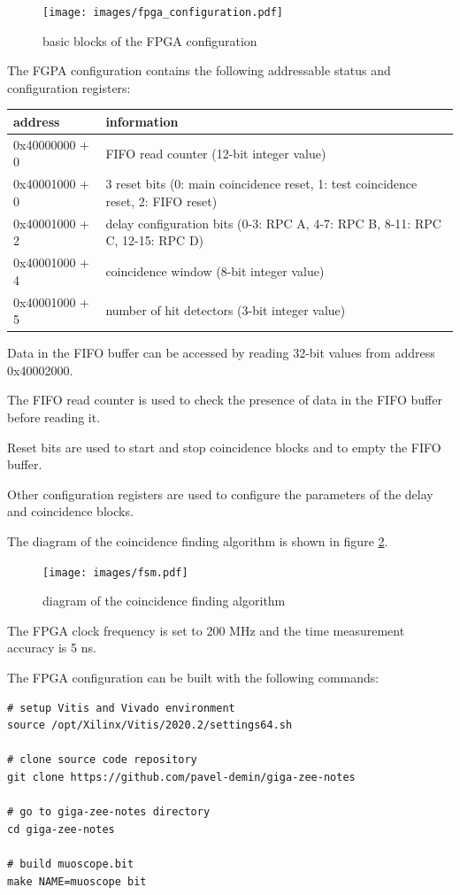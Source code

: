 \documentclass[12pt, a4paper]{article}
\begin{document}
\begin{figure}[h!]
  \centering
  \texttt{[image: images/fpga\_configuration.pdf]}
  \caption{basic blocks of the FPGA configuration}
  \label{fig:fpga_configuration}
\end{figure}

The FGPA configuration contains the following addressable status and configuration registers:
\begin{center}
  \begin{tabular}{|l|l|}
  \hline
  \textbf{address} & \textbf{information} \\
  \hline
  0x40000000 + 0 & FIFO read counter (12-bit integer value) \\
  \hline
  0x40001000 + 0 & 3 reset bits (0: main coincidence reset, 1: test coincidence reset, 2: FIFO reset) \\
  \hline
  0x40001000 + 2 & delay configuration bits (0-3: RPC A, 4-7: RPC B, 8-11: RPC C, 12-15: RPC D) \\
  \hline
  0x40001000 + 4 & coincidence window (8-bit integer value) \\
  \hline
  0x40001000 + 5 & number of hit detectors (3-bit integer value) \\
  \hline
  \end{tabular}
\end{center}

Data in the FIFO buffer can be accessed by reading 32-bit values from address 0x40002000.

The FIFO read counter is used to check the presence of data in the FIFO buffer before reading it.

Reset bits are used to start and stop coincidence blocks and to empty the FIFO buffer.

Other configuration registers are used to configure the parameters of the delay and coincidence blocks.

The diagram of the coincidence finding algorithm is shown in figure \ref{fig:fsm}.

\begin{figure}[h!]
  \centering
  \texttt{[image: images/fsm.pdf]}
  \caption{diagram of the coincidence finding algorithm}
  \label{fig:fsm}
\end{figure}

The FPGA clock frequency is set to 200 MHz and the time measurement accuracy is 5 ns.

The FPGA configuration can be built with the following commands:
\vspace{-1ex}
\begin{verbatim}
# setup Vitis and Vivado environment
source /opt/Xilinx/Vitis/2020.2/settings64.sh

# clone source code repository
git clone https://github.com/pavel-demin/giga-zee-notes

# go to giga-zee-notes directory
cd giga-zee-notes

# build muoscope.bit
make NAME=muoscope bit
\end{verbatim}
\end{document}
